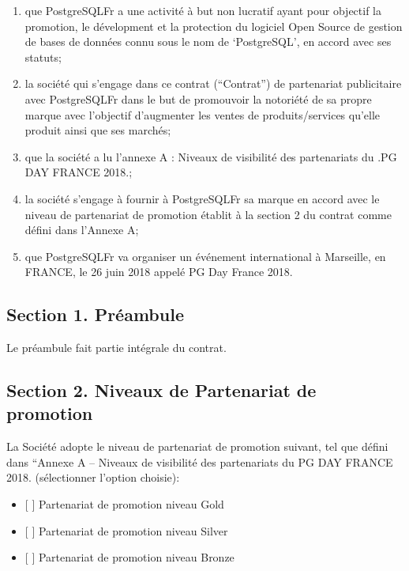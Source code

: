\documentclass[]{article}
\providecommand{\tightlist}{%
  \setlength{\itemsep}{0pt}\setlength{\parskip}{0pt}}
\begin{document}
\begin{enumerate}
\def\labelenumi{\arabic{enumi}.}
\tightlist
\item
  que PostgreSQLFr a une activité à but non lucratif ayant pour objectif
  la promotion, le dévelopment et la protection du logiciel Open Source
  de gestion de bases de données connu sous le nom de `PostgreSQL', en
  accord avec ses statuts;
\item
  la société qui s'engage dans ce contrat (``Contrat'') de partenariat
  publicitaire avec PostgreSQLFr dans le but de promouvoir la notoriété
  de sa propre marque avec l'objectif d'augmenter les ventes de
  produits/services qu'elle produit ainsi que ses marchés;
\item
  que la société a lu l'annexe A : Niveaux de visibilité des
  partenariats du .PG DAY FRANCE 2018.;
\item
  la société s'engage à fournir à PostgreSQLFr sa marque en accord avec
  le niveau de partenariat de promotion établit à la section 2 du
  contrat comme défini dans l'Annexe A;
\item
  que PostgreSQLFr va organiser un événement international à Marseille,
  en FRANCE, le 26 juin 2018 appelé PG Day France 2018.
\end{enumerate}

\hypertarget{section-1.-pruxe9ambule}{%
\subsection{Section 1. Préambule}\label{section-1.-pruxe9ambule}}

Le préambule fait partie intégrale du contrat.

\hypertarget{section-2.-niveaux-de-partenariat-de-promotion}{%
\subsection{Section 2. Niveaux de Partenariat de
promotion}\label{section-2.-niveaux-de-partenariat-de-promotion}}

La Société adopte le niveau de partenariat de promotion suivant, tel que
défini dans ``Annexe A -- Niveaux de visibilité des partenariats du PG
DAY FRANCE 2018. (sélectionner l'option choisie):

\begin{itemize}
\tightlist
\item
  {[} {]} Partenariat de promotion niveau Gold
\item
  {[} {]} Partenariat de promotion niveau Silver
\item
  {[} {]} Partenariat de promotion niveau Bronze
\end{itemize}
\end{document}
